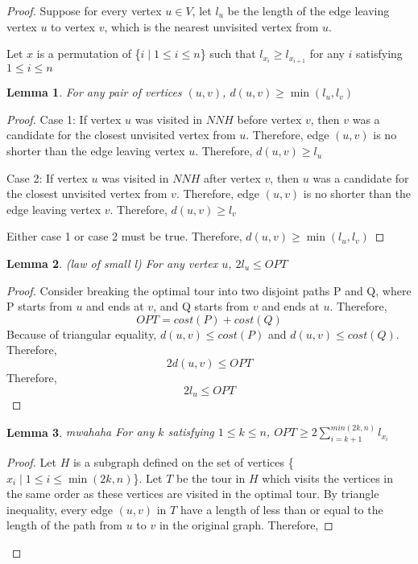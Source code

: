\documentclass[paper=a4, fontsize=11pt]{scrartcl}	%
\numberwithin{equation}{section}		%
\numberwithin{figure}{section}			%
\numberwithin{table}{section}				%
\newtheorem{lemma}{Lemma}
\begin{document}
\begin{proof}
Suppose for every vertex $u\in V$, let $l_{u}$ be the length of the edge leaving vertex $u$ to vertex $v$, which is the nearest unvisited vertex from $u$.
\item
Let $x$ is a permutation of \{$i\mid 1\leq i \leq n$\} such that $l_{x_i} \geq l_{x_{i+1}}$ for any $i$ satisfying $1\leq i\le n$
\begin{lemma}
For any pair of vertices $(u,v)$, $d(u,v)\geq \min(l_{u},l_{v})$
\end{lemma}
\begin{proof}
\item
Case 1: If vertex $u$ was visited in $NNH$ before vertex $v$, then $v$ was a candidate for the closest unvisited vertex from $u$. Therefore, edge $(u,v)$ is no shorter than the edge leaving vertex $u$. Therefore, $d(u,v)\geq l_{u}$
\item
Case 2: If vertex $u$ was visited in $NNH$ after vertex $v$, then $u$ was a candidate for the closest unvisited vertex from $v$. Therefore, edge $(u,v)$ is no shorter than the edge leaving vertex $v$. Therefore, $d(u,v)\geq l_{v}$
\item Either case 1 or case 2 must be true. Therefore, $d(u,v)\geq \min(l_{u},l_{v})$
\end{proof}
\begin{lemma}
\label{law of small l}
\emph{(law of small l)}
For any vertex $u$, $2l_{u}\leq OPT$
\end{lemma}
\begin{proof}
Consider breaking the optimal tour into two disjoint paths P and Q, where P starts from $u$ and ends at $v$, and Q starts from $v$ and ends at $u$. Therefore, 
\[OPT = cost(P) + cost(Q)\]
Because of triangular equality, $d(u,v)\leq cost(P)$ and $d(u,v)\leq cost(Q)$. Therefore, 
\[2d(u,v)\leq OPT\]
Therefore, 
\[2l_{u}\leq OPT\]
\end{proof}
\begin{lemma}
\label{mwahaha}
\emph{mwahaha}
For any $k$ satisfying $1\leq k\leq n$, $OPT\geq 2\sum\limits_{i=k+1}^{min(2k,n)}l_{x_i}$
\end{lemma}
\begin{proof}
Let $H$ is a subgraph defined on the set of vertices \{$x_i\mid 1\leq i \leq \min(2k,n)$\}. Let $T$ be the tour in $H$ which visits the vertices in the same order as these vertices are visited in the optimal tour. By triangle inequality, every edge $(u,v)$ in $T$ have a length of less than or equal to the length of the path from $u$ to $v$ in the original graph. Therefore, 

\end{proof}
\end{proof}
\end{document}
